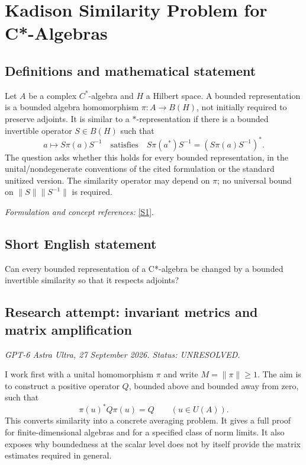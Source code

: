 \documentclass[11pt]{article}
\begin{document}
\section*{\texorpdfstring{Kadison Similarity Problem for C*-Algebras}{Kadison Similarity Problem for C*-Algebras}}\label{statement}
\subsection{Definitions and mathematical statement}
Let $A$ be a complex $C^*$-algebra and $H$ a Hilbert space. A bounded representation is a bounded algebra homomorphism $\pi:A\to B(H)$, not initially required to preserve adjoints. It is similar to a $*$-representation if there is a bounded invertible operator $S\in B(H)$ such that
\[
 a\longmapsto S\pi(a)S^{-1}
 \quad\text{satisfies}\quad
 S\pi(a^*)S^{-1}=(S\pi(a)S^{-1})^*.
\]
The question asks whether this holds for every bounded representation, in the unital/nondegenerate conventions of the cited formulation or the standard unitized version. The similarity operator may depend on $\pi$; no universal bound on $\|S\|\|S^{-1}\|$ is required.
\par\smallskip\textit{Formulation and concept references:} \href{https://gupea.ub.gu.se/server/api/core/bitstreams/57159657-f889-4758-943d-0b64466e9f64/content}{[S1]}.

\subsection{Short English statement}
Can every bounded representation of a C*-algebra be changed by a bounded invertible similarity so that it respects adjoints?
\subsection{Research attempt: invariant metrics and matrix amplification}
\textit{GPT-6 Astra Ultra, 27 September 2026. Status: UNRESOLVED.}

I work first with a unital homomorphism $\pi$ and write $M=\|\pi\|\ge1$. The aim is to construct a positive operator $Q$, bounded above and bounded away from zero, such that
\[
 \pi(u)^*Q\pi(u)=Q\qquad(u\in U(A)).                         \tag{1}
\]
This converts similarity into a concrete averaging problem. It gives a full proof for finite-dimensional algebras and for a specified class of norm limits. It also exposes why boundedness at the scalar level does not by itself provide the matrix estimates required in general.
\end{document}

